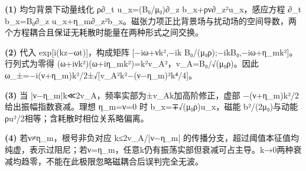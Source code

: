 \par\noindent\textbf{(1)} 均匀背景下动量线化 ρ∂\_t u\_x=(B₀/μ₀)∂\_z b\_x+ρν∂\_z²u\_x，感应方程 ∂\_t b\_x=B₀∂\_z u\_x+η\_m∂\_z²b\_x。磁张力项正比背景场与扰动场的空间导数，两个方程耦合且保证无耗散时能量在两种形式之间交换。
\par\noindent\textbf{(2)} 代入 exp[i(kz−ωt)]，构成矩阵 [−iω+νk²,−ik B₀/(μ₀ρ);−ikB₀,−iω+η\_mk²]。行列式为零得 (ω+iνk²)(ω+iη\_mk²)=k²v\_A²，v\_A=B₀/√(μ₀ρ)。因此 ω\_±=−i(ν+η\_m)k²/2±√[v\_A²k²−(ν−η\_m)²k⁴/4]。
\par\noindent\textbf{(3)} 当 |ν−η\_m|k≪2v\_A，频率实部为±v\_Ak加高阶修正，虚部 −(ν+η\_m)k²/2 给出振幅指数衰减。理想 η\_m=ν=0 时 b\_x=∓√(μ₀ρ)u\_x，磁能 b²/(2μ₀)与动能ρu²/2相等；含耗散时相位关系略偏离。
\par\noindent\textbf{(4)} 若ν≠η\_m，根号非负对应 k≤2v\_A/|ν−η\_m| 的传播分支，超过阈值本征值均纯虚，表示过阻尼；若ν=η\_m，任意k仍有振荡实部但衰减可占主导。k→0两种衰减均趋零，不能在此极限忽略磁耦合后误判完全无波。
